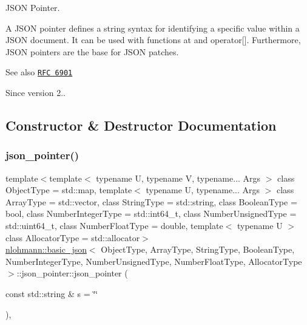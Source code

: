 J\+S\+ON Pointer. 

A J\+S\+ON pointer defines a string syntax for identifying a specific value within a J\+S\+ON document. It can be used with functions {\ttfamily at} and {\ttfamily operator\mbox{[}\mbox{]}}. Furthermore, J\+S\+ON pointers are the base for J\+S\+ON patches.

\begin{DoxySeeAlso}{See also}
\href{https://tools.ietf.org/html/rfc6901}{\tt R\+FC 6901}
\end{DoxySeeAlso}
\begin{DoxySince}{Since}
version 2.. 
\end{DoxySince}


\subsection{Constructor \& Destructor Documentation}
\hypertarget{classnlohmann_1_1basic__json_1_1json__pointer_ae12db117a2742d826465080979d7c835}{}\label{classnlohmann_1_1basic__json_1_1json__pointer_ae12db117a2742d826465080979d7c835} 
\subsubsection{\texorpdfstring{json\+\_\+pointer()}{json\_pointer()}}
{\footnotesize\ttfamily template$<$template$<$ typename U, typename V, typename... Args $>$ class Object\+Type = std\+::map, template$<$ typename U, typename... Args $>$ class Array\+Type = std\+::vector, class String\+Type  = std\+::string, class Boolean\+Type  = bool, class Number\+Integer\+Type  = std\+::int64\+\_\+t, class Number\+Unsigned\+Type  = std\+::uint64\+\_\+t, class Number\+Float\+Type  = double, template$<$ typename U $>$ class Allocator\+Type = std\+::allocator$>$ \\
\hyperlink{classnlohmann_1_1basic__json}{nlohmann\+::basic\+\_\+json}$<$ Object\+Type, Array\+Type, String\+Type, Boolean\+Type, Number\+Integer\+Type, Number\+Unsigned\+Type, Number\+Float\+Type, Allocator\+Type $>$\+::json\+\_\+pointer\+::json\+\_\+pointer (\begin{DoxyParamCaption}\item[{const std\+::string \&}]{s = {\ttfamily \char`\"{}\char`\"{}} }\end{DoxyParamCaption})\hspace{0.3cm}{\ttfamily [inline]}, {\ttfamily [explicit]}}



